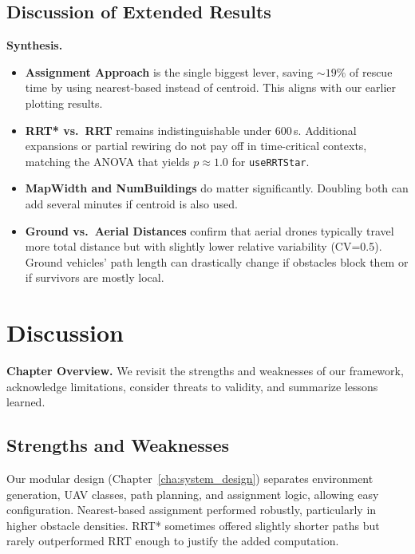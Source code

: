 \documentclass[12pt,a4paper]{report}
\begin{document}
\section{Discussion of Extended Results}
\label{sec:analysis_extended_discussion}
\textbf{Synthesis.}  
\begin{itemize}
    \item \textbf{Assignment Approach} is the single biggest lever, saving \(\sim 19\%\) of rescue time 
    by using nearest-based instead of centroid. This aligns with our earlier plotting results.
    \item \textbf{RRT* vs.\ RRT} remains indistinguishable under 600\,s. Additional expansions 
    or partial rewiring do not pay off in time-critical contexts, matching the ANOVA that 
    yields $p \approx 1.0$ for \texttt{useRRTStar}.
    \item \textbf{MapWidth and NumBuildings} do matter significantly. Doubling both can add 
    several minutes if centroid is also used.
    \item \textbf{Ground vs.\ Aerial Distances} confirm that aerial drones typically 
    travel more total distance but with slightly lower relative variability (CV=0.5). 
    Ground vehicles’ path length can drastically change if obstacles block them or if 
    survivors are mostly local.
\end{itemize}

\chapter{Discussion}
\label{ch:discussion2}

\textbf{Chapter Overview.} We revisit the strengths and weaknesses of our framework,
acknowledge limitations, consider threats to validity, and summarize lessons learned.

\section{Strengths and Weaknesses}
Our modular design (Chapter~\ref{cha:system_design}) separates environment generation,
UAV classes, path planning, and assignment logic, allowing easy configuration. Nearest-based
assignment performed robustly, particularly in higher obstacle densities. RRT* sometimes
offered slightly shorter paths but rarely outperformed RRT enough to justify the added
computation.
\end{document}
